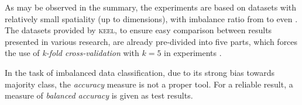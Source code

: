 \documentclass[pmlr]{jmlr}
\begin{document}
\begin{table}[!h]
\centering
{}
\caption{Summary of imbalanced datasets chosen for evaluation}\label{tab:datasets}
\end{table}
  

As may be observed in the summary, the experiments are based on datasets with relatively small spatiality (up to  dimensions), with imbalance ratio from  to even . The datasets provided by \textsc{keel}, to ensure easy comparison between results presented in various research, are already pre-divided into five parts, which forces the use of \emph{k-fold cross-validation} with $k = 5$ in experiments \citep{alpaydin2009introduction}.

In the task of imbalanced data classification, due to its strong bias towards majority class, the \emph{accuracy} measure is not a proper tool. For a reliable result, a measure of \emph{balanced accuracy} is given as test results.
\end{document}
